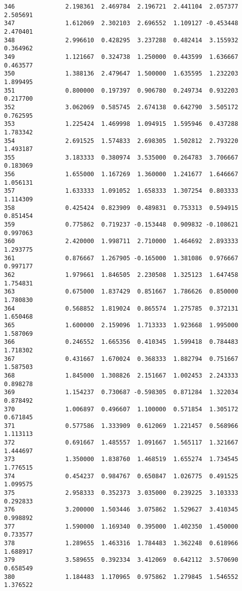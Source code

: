 \documentclass[11pt]{article}
\begin{document}
\begin{Verbatim}[commandchars=\\\{\}]
346              2.198361  2.469784  2.196721  2.441104  2.057377  2.505691
347              1.612069  2.302103  2.696552  1.109127 -0.453448  2.470401
348              2.996610  0.428295  3.237288  0.482414  3.155932  0.364962
349              1.121667  0.324738  1.250000  0.443599  1.636667  0.463577
350              1.388136  2.479647  1.500000  1.635595  1.232203  1.899495
351              0.800000  0.197397  0.906780  0.249734  0.932203  0.217700
352              3.062069  0.585745  2.674138  0.642790  3.505172  0.762595
353              1.225424  1.469998  1.094915  1.595946  0.437288  1.783342
354              2.691525  1.574833  2.698305  1.502812  2.793220  1.493187
355              3.183333  0.380974  3.535000  0.264783  3.706667  0.183069
356              1.655000  1.167269  1.360000  1.241677  1.646667  1.056131
357              1.633333  1.091052  1.658333  1.307254  0.803333  1.114309
358              0.425424  0.823909  0.489831  0.753313  0.594915  0.851454
359              0.775862  0.719237 -0.153448  0.909832 -0.108621  0.997063
360              2.420000  1.998711  2.710000  1.464692  2.893333  1.293775
361              0.876667  1.267905 -0.165000  1.381086  0.976667  0.997177
362              1.979661  1.846505  2.230508  1.325123  1.647458  1.754831
363              0.675000  1.837429  0.851667  1.786626  0.850000  1.780830
364              0.568852  1.819024  0.865574  1.275785  0.372131  1.650468
365              1.600000  2.159096  1.713333  1.923668  1.995000  1.587069
366              0.246552  1.665356  0.410345  1.599418  0.784483  1.718302
367              0.431667  1.670024  0.368333  1.882794  0.751667  1.587503
368              1.845000  1.308826  2.151667  1.002453  2.243333  0.898278
369              1.154237  0.730687 -0.598305  0.871284  1.322034  0.878492
370              1.006897  0.496607  1.100000  0.571854  1.305172  0.671845
371              0.577586  1.333909  0.612069  1.221457  0.568966  1.113113
372              0.691667  1.485557  1.091667  1.565117  1.321667  1.444697
373              1.350000  1.838760  1.468519  1.655274  1.734545  1.776515
374              0.454237  0.984767  0.650847  1.026775  0.491525  1.099575
375              2.958333  0.352373  3.035000  0.239225  3.103333  0.292833
376              3.200000  1.503446  3.075862  1.529627  3.410345  0.998892
377              1.590000  1.169340  0.395000  1.402350  1.450000  0.733577
378              1.289655  1.463316  1.784483  1.362248  0.618966  1.688917
379              3.589655  0.392334  3.412069  0.642112  3.570690  0.658549
380              1.184483  1.170965  0.975862  1.279845  1.546552  1.376522

\end{Verbatim}
\end{document}
